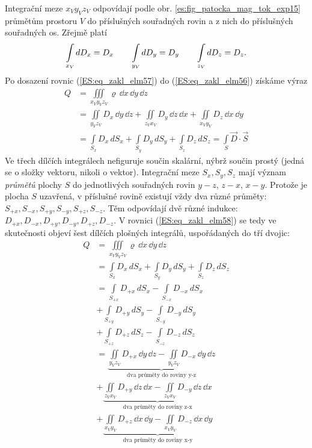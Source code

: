       Integrační meze \(x_Vy_Vz_V\) odpovídají podle obr. \ref{es:fig_patocka_mag_tok_exp15} 
      průmětům prostoru \(V\) do příslušných souřadných rovin a z nich do příslušných souřadných 
      os. Zřejmě platí
      \begin{equation}\label{ES:eq_zakl_elm57}
        \limitint_{\mathclap{x_V}}dD_x = D_x \qquad
        \limitint_{\mathclap{y_V}}dD_y = D_y \qquad
        \limitint_{\mathclap{z_V}}dD_z = D_z.
      \end{equation}
      Po dosazení rovnic (\ref{ES:eq_zakl_elm57}) do (\ref{ES:eq_zakl_elm56}) získáme výraz
      \begin{align}\label{ES:eq_zakl_elm58}
        Q &= \iiint\limits_{x_Vy_Vz_V}\varrho\,\dd{x}\,\dd{y}\,\dd{z}   \nonumber\\ 
          &= \iint\limits_{y_Vz_V}D_x\,\dd{y}\,\dd{z} + 
             \iint\limits_{z_Vx_V}D_y\,\dd{z}\,\dd{x} + 
             \iint\limits_{x_Vy_V}D_z\,\dd{x}\,\dd{y}               \nonumber\\ 
          &= \int\limits_{S_x}D_x\,dS_x + 
             \int\limits_{S_y}D_y\,dS_y + 
             \int\limits_{S_z}D_z\,dS_z =  \int\limits_{S}\vec{D}\cdot\vec{S}
      \end{align}
      Ve třech dílčích integrálech nefiguruje součin skalární, nýbrž součin prostý (jedná se o 
      složky vektoru, nikoli o vektor). Integrační meze \(S_x, S_y, S_z\) mají význam 
      \emph{průmětů} plochy \(S\) do jednotlivých souřadných rovin \(y-z\), \(z-x\), \(x-y\). 
      Protože je plocha \(S\) uzavřená, v příslušné rovině existují vždy dva různé průměty: 
      \(S_{+x}, S_{-x}, S_{+y}, S_{-y}, S_{+z}, S_{-z}\). Těm odpovídají dvě různé indukce: 
      \(D_{+x}, D_{-x}, D_{+y}, D_{-y}, D_{+z}, D_{-z}\). V rovnici (\ref{ES:eq_zakl_elm58}) se 
      tedy ve skutečnosti objeví šest dílčích plošných integrálů, uspořádaných do tří dvojic:
      \begin{align*}   %
        Q &= \iiint\limits_{x_Vy_Vz_V}\varrho\,\dd{x}\,\dd{y}\,\dd{z}                  \\
          &= \int\limits_{S_x}D_x\,dS_x + 
             \int\limits_{S_y}D_y\,dS_y + 
             \int\limits_{S_z}D_z\,dS_z                                                \\
          &= \int\limits_{S_{+x}}D_{+x}\,dS_x - \int\limits_{S_{-x}}D_{-x}\,dS_x       \\
          &+ \int\limits_{S_{+y}}D_{+y}\,dS_y - \int\limits_{S_{-y}}D_{-y}\,dS_y       \\
          &+ \int\limits_{S_{+z}}D_{+z}\,dS_z - \int\limits_{S_{-z}}D_{-z}\,dS_z       \\
          &= \underbrace{\iint\limits_{y_Vz_V}D_{+x}\,\dd{y}\,\dd{z} 
           - \iint\limits_{y_Vz_V}D_{-x}\,\dd{y}\,\dd{z}}_{\text{dva průměty do roviny y-z}}   \\
          &+ \underbrace{\iint\limits_{z_Vx_V}D_{+y}\,\dd{z}\,\dd{x} 
           - \iint\limits_{z_Vx_V}D_{-y}\,\dd{z}\,\dd{x}}_{\text{dva průměty do roviny z-x}}   \\
          &+ \underbrace{\iint\limits_{x_Vy_V}D_{+z}\,\dd{x}\,\dd{y} 
           - \iint\limits_{x_Vy_V}D_{-z}\,\dd{x}\,\dd{y}}_{\text{dva průměty do roviny x-y}}
      \end{align*}
